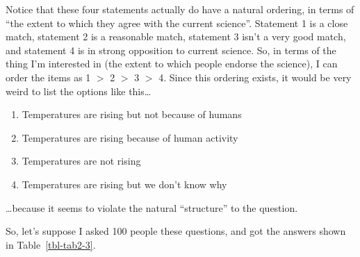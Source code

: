 \documentclass[
  a4paper,
]{book}
\providecommand{\tightlist}{%
  \setlength{\itemsep}{0pt}\setlength{\parskip}{0pt}}\usepackage{longtable,booktabs,array}
\begin{document}
Notice that these four statements actually do have a natural ordering,
in terms of ``the extent to which they agree with the current science''.
Statement 1 is a close match, statement 2 is a reasonable match,
statement 3 isn't a very good match, and statement 4 is in strong
opposition to current science. So, in terms of the thing I'm interested
in (the extent to which people endorse the science), I can order the
items as 1 \(>\) 2 \(>\) 3 \(>\) 4. Since this ordering exists, it would
be very weird to list the options like this\ldots{}

\begin{enumerate}
\def\labelenumi{\arabic{enumi}.}
\tightlist
\item
  Temperatures are rising but not because of humans
\item
  Temperatures are rising because of human activity
\item
  Temperatures are not rising
\item
  Temperatures are rising but we don't know why
\end{enumerate}

\ldots because it seems to violate the natural ``structure'' to the
question.

So, let's suppose I asked 100 people these questions, and got the
answers shown in Table~\ref{tbl-tab2-3}.

\hypertarget{tbl-tab2-3}{}
 
  \providecommand{\huxb}[2]{\arrayrulecolor[RGB]{#1}\global\arrayrulewidth=#2pt}
  \providecommand{\huxvb}[2]{\color[RGB]{#1}\vrule width #2pt}
  \providecommand{\huxtpad}[1]{\rule{0pt}{#1}}
  \providecommand{\huxbpad}[1]{\rule[-#1]{0pt}{#1}}
\end{document}
